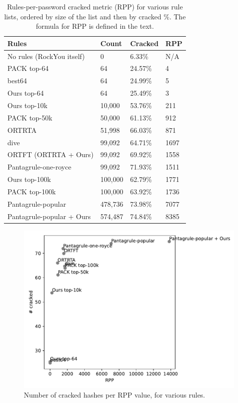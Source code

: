 \documentclass[letterpaper,twocolumn,10pt]{article}
\begin{document}
\begin{table}
\centering
\begin{tabular}{|l|l|l|l|}
  \hline
  Rules & Count & Cracked & RPP \\
  \hline
  No rules (RockYou itself) & 0 & 6.33\% & N/A \\
  PACK top-64 & 64 & 24.57\% & 4 \\
  best64 & 64 & 24.99\% & 5 \\
  Ours top-64 & 64 & 25.49\% & 3 \\
  Ours top-10k & 10,000 & 53.76\% & 211 \\
  PACK top-50k & 50,000 & 61.13\% & 912 \\
  ORTRTA & 51,998 & 66.03\% & 871 \\
  dive & 99,092 & 64.71\% & 1697 \\
  ORTFT (ORTRTA + Ours) & 99,092 & 69.92\% & 1558 \\
  Pantagrule-one-royce & 99,092 & 71.93\% & 1511 \\
  Ours top-100k & 100,000 & 62.79\% & 1771 \\
  PACK top-100k & 100,000 & 63.92\% & 1736 \\
  Pantagrule-popular & 478,736 & 73.98\% & 7077 \\
  Pantagrule-popular + Ours & 574,487 & 74.84\% & 8385 \\
  \hline
\end{tabular}
\caption{Rules-per-password cracked metric (RPP) for various rule lists, ordered
by size of the list and then by cracked \%. The formula for RPP is defined in
the text.}
\label{tab:rpp}
\end{table}

\begin{figure}[h]
    \includegraphics[width=\linewidth]
{../cracked_attempted_rpp_plot_b187899c-a7a0-11ed-8444-005056c00001.pdf}
    \caption{Number of cracked hashes per RPP value, for various rules.}
    \label{fig:rpp}
\end{figure}
\end{document}

